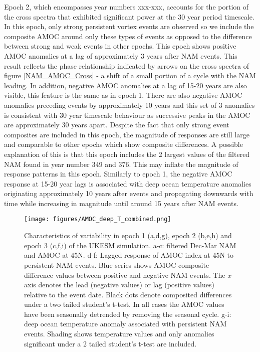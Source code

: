 Epoch 2, which encompasses year numbers xxx-xxx, accounts for the portion of the cross spectra that exhibited significant power at the 30 year period timescale. In this epoch, only strong persistent vortex events are observed so we include the composite AMOC around only these types of events as opposed to the difference between strong and weak events in other epochs. This epoch shows positive AMOC anomalies at a lag of approximately 3 years after NAM events. This result reflects the phase relationship indicated by arrows on the cross spectra of figure \ref{NAM_AMOC_Cross} - a shift of a small portion of a cycle with the NAM leading. In addition, negative AMOC anomalies at a lag of 15-20 years are also visible, this feature is the same as in epoch 1. There are also negative AMOC anomalies preceding events by approximately 10 years and this set of 3 anomalies is consistent with 30 year timescale behaviour as successive peaks in the AMOC are approximately 30 years apart. Despite the fact that only strong event composites are included in this epoch, the magnitude of responses are still large and comparable to other epochs which show composite differences. A possible explanation of this is that this epoch includes the 2 largest values of the filtered NAM found in year number 349 and 376. This may inflate the magnitude of response patterns in this epoch. Similarly to epoch 1, the negative AMOC response at 15-20 year lags is associated with deep ocean temperature anomalies originating approximately 10 years after events and propagating downwards with time while increasing in magnitude until around 15 years after NAM events. 

\begin{center}
\begin{figure}[h!]
\noindent\texttt{[image: figures/AMOC\_deep\_T\_combined.png]}
\caption{Characteristics of variability in epoch 1 (a,d,g), epoch 2 (b,e,h) and epoch 3 (c,f,i) of the UKESM simulation. a-c: filtered Dec-Mar NAM and AMOC at 45N. d-f: Lagged response of AMOC index at 45N to persistent NAM events. Blue series shows AMOC composite difference values between positive and negative NAM events. The $x$ axis denotes the lead (negative values) or lag (positive values) relative to the event date. Black dots denote composited differences under a two tailed student's t-test. In all cases the AMOC values have been seasonally detrended by removing the seasonal cycle.
g-i: deep ocean temperature anomaly associated with persistent NAM events. Shading shows temperature values and only anomalies significant under a 2 tailed student's t-test are included.}
\label{epoch_composites_combined}
\end{figure}
\end{center}

